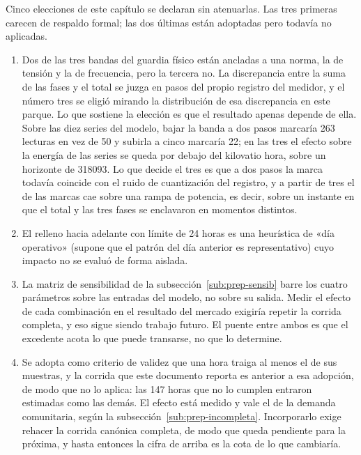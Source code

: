Cinco elecciones de este capítulo se declaran sin atenuarlas. Las tres
primeras carecen de respaldo formal; las dos últimas están adoptadas pero
todavía no aplicadas.

\begin{enumerate}[leftmargin=*, itemsep=0.35em]
 \item Dos de las tres bandas del guardia físico están ancladas a una
 norma, la de tensión y la de frecuencia, pero la tercera no. La
 discrepancia entre la suma de las fases y el total se juzga en pasos
 del propio registro del medidor, y el número tres se eligió mirando la
 distribución de esa discrepancia en este parque. Lo que sostiene la
 elección es que el resultado apenas depende de ella. Sobre las diez
 series del modelo, bajar la banda a dos pasos marcaría \num{263}
 lecturas en vez de \num{50} y subirla a cinco marcaría \num{22}; en
 las tres el efecto sobre la energía de las series se queda por debajo
 del kilovatio hora, sobre un horizonte de \num{318093}. Lo que decide
 el tres es que a dos pasos la marca todavía coincide con el ruido de
 cuantización del registro, y a partir de tres el  de las
 marcas cae sobre una rampa de potencia, es decir, sobre un instante en
 que el total y las tres fases se enclavaron en momentos distintos.

 \item El relleno hacia adelante con límite de 24 horas es una
 heurística de «día operativo» (supone que el patrón del día anterior es
 representativo) cuyo impacto no se evaluó de forma aislada.

 \item La matriz de sensibilidad de la
 subsección~\ref{sub:prep-sensib} barre los cuatro parámetros sobre las
 entradas del modelo, no sobre su salida. Medir el efecto de cada
 combinación en el resultado del mercado exigiría repetir la corrida
 completa, y eso sigue siendo trabajo futuro. El puente entre ambos es
 que el excedente acota lo que puede transarse, no que lo determine.
 \item Se adopta como criterio de validez que una hora traiga al menos el
  de sus muestras, y la corrida que este documento reporta es
 anterior a esa adopción, de modo que no lo aplica: las \num{147} horas
 que no lo cumplen entraron estimadas como las demás. El efecto está
 medido y vale el  de la demanda comunitaria, según la
 subsección~\ref{sub:prep-incompleta}. Incorporarlo exige rehacer la corrida
 canónica completa, de modo que queda pendiente para la próxima, y hasta
 entonces la cifra de arriba es la cota de lo que cambiaría.


\end{enumerate}
